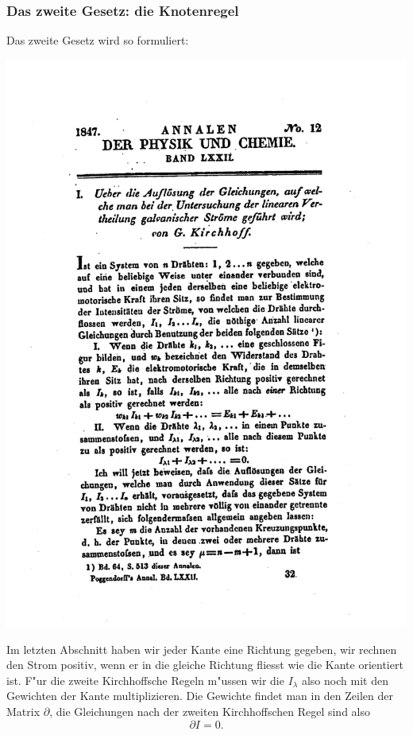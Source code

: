 \subsubsection{Das zweite Gesetz: die Knotenregel}
Das zweite Gesetz wird so formuliert:
\bigskip
\begin{center}
\includegraphics[width=\hsize]{applications/kh2}
\end{center}
\bigskip
Im letzten Abschnitt haben wir jeder Kante eine Richtung gegeben,
wir rechnen den Strom positiv, wenn er in die gleiche Richtung fliesst
wie die Kante orientiert ist. F"ur die zweite Kirchhoffsche Regeln
m"ussen wir die $I_\lambda$ also noch mit den Gewichten der Kante
multiplizieren. Die Gewichte findet man in den Zeilen der Matrix
$\partial$, die Gleichungen nach der zweiten Kirchhoffschen
Regel sind also
\[
\partial I=0.
\]

